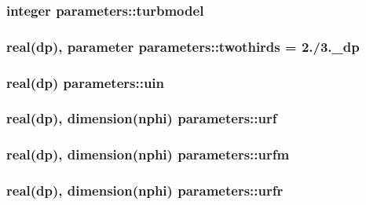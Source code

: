 \hypertarget{classparameters_af51c886efc5599880eb47db610a872fb}{
\subsubsection[{turbmodel}]{\setlength{\rightskip}{0pt plus 5cm}integer parameters\-::turbmodel}}\label{classparameters_af51c886efc5599880eb47db610a872fb}
\hypertarget{classparameters_aec1690016adeab2f5c099dded961c641}{
\subsubsection[{twothirds}]{\setlength{\rightskip}{0pt plus 5cm}real(dp), parameter parameters\-::twothirds = 2./3.\-\_\-dp}}\label{classparameters_aec1690016adeab2f5c099dded961c641}
\hypertarget{classparameters_a12b29a4f3770320f45729a36df67fe2d}{
\subsubsection[{uin}]{\setlength{\rightskip}{0pt plus 5cm}real(dp) parameters\-::uin}}\label{classparameters_a12b29a4f3770320f45729a36df67fe2d}
\hypertarget{classparameters_a9dac8e54229c855e6bb271118f1fb28e}{
\subsubsection[{urf}]{\setlength{\rightskip}{0pt plus 5cm}real(dp), dimension({\bf nphi}) parameters\-::urf}}\label{classparameters_a9dac8e54229c855e6bb271118f1fb28e}
\hypertarget{classparameters_a9b8aced595d144d6e348de4e7bb28028}{
\subsubsection[{urfm}]{\setlength{\rightskip}{0pt plus 5cm}real(dp), dimension({\bf nphi}) parameters\-::urfm}}\label{classparameters_a9b8aced595d144d6e348de4e7bb28028}
\hypertarget{classparameters_a6770f8f79f30a3a3c822094fa25f0ce4}{
\subsubsection[{urfr}]{\setlength{\rightskip}{0pt plus 5cm}real(dp), dimension({\bf nphi}) parameters\-::urfr}}\label{classparameters_a6770f8f79f30a3a3c822094fa25f0ce4}
